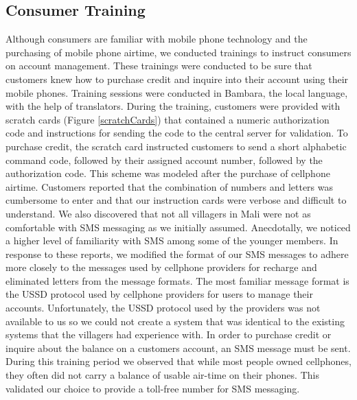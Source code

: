 \documentclass{sig-alternate}
\begin{document}
\subsection{Consumer Training}
Although consumers are familiar with mobile phone technology and the
purchasing of mobile phone airtime, we conducted trainings to instruct
consumers on account management.
These trainings were conducted to be sure that customers knew how to
purchase credit and inquire into their account using their mobile
phones.
Training sessions were conducted in Bambara, the local language, with
the help of translators.
During the training, customers were provided with scratch cards (Figure
\ref{scratchCards}) that contained a numeric authorization code and
instructions for sending the code to the central server for
validation.
To purchase credit, the scratch card instructed customers to send a
short alphabetic command code, followed by their assigned account
number, followed by the authorization code.
This scheme was modeled after the purchase of cellphone airtime.
Customers reported that the combination of numbers and letters was
cumbersome to enter and that our instruction cards were verbose and
difficult to understand.
We also discovered that not all villagers in Mali were not as
comfortable with SMS messaging as we initially assumed.
Anecdotally, we noticed a higher level of familiarity with SMS
among some of the younger members.
In response to these reports, we modified the format of our SMS messages
to adhere more closely to the messages used by cellphone providers for
recharge and eliminated letters from the message formats.
The most familiar message format is the USSD protocol used by
cellphone providers for users to manage their accounts.
Unfortunately, the USSD protocol used by the providers was not available
to us so we could not create a system that was identical to the existing
systems that the villagers had experience with.
In order to purchase credit or inquire about the balance on a customers
account, an SMS message must be sent.
During this training period we observed that while most people owned
cellphones, they often did not carry a balance of usable air-time on
their phones.
This validated our choice to provide a toll-free number for SMS messaging.

\end{document}

